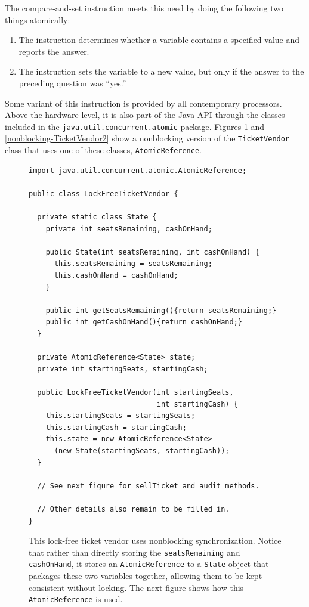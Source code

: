 The compare-and-set instruction meets this need by doing the following two things atomically:
\begin{enumerate}
\item The instruction determines whether a variable contains a specified value and reports the answer.
\item The instruction sets the variable to a new value, but only if the answer to the preceding question was ``yes.''
\end{enumerate}
Some variant of this instruction is provided by all contemporary processors.  Above the hardware
level, it is also part of the Java API through the classes included in the \texttt{java.util.concurrent.atomic} package.
Figures \ref{nonblocking-TicketVendor1} and \ref{nonblocking-TicketVendor2} show a nonblocking version of the \texttt{TicketVendor} class that uses one
of these classes, \texttt{AtomicReference}.
\begin{figure}
\begin{verbatim}
import java.util.concurrent.atomic.AtomicReference;

public class LockFreeTicketVendor { 
    
  private static class State {
    private int seatsRemaining, cashOnHand;
    
    public State(int seatsRemaining, int cashOnHand) {
      this.seatsRemaining = seatsRemaining;
      this.cashOnHand = cashOnHand;
    }

    public int getSeatsRemaining(){return seatsRemaining;}
    public int getCashOnHand(){return cashOnHand;}
  }

  private AtomicReference<State> state;
  private int startingSeats, startingCash;

  public LockFreeTicketVendor(int startingSeats,
                              int startingCash) {
    this.startingSeats = startingSeats;
    this.startingCash = startingCash;
    this.state = new AtomicReference<State>
      (new State(startingSeats, startingCash));
  }

  // See next figure for sellTicket and audit methods.

  // Other details also remain to be filled in.
}
\end{verbatim}
\caption{This lock-free ticket vendor uses nonblocking synchronization.
Notice that rather than directly storing the \texttt{seatsRemaining}
and \texttt{cashOnHand}, it stores an \texttt{AtomicReference} to a
\texttt{State} object that packages these two variables together,
allowing them to be kept consistent without locking.
The next figure shows how this \texttt{AtomicReference} is used.}\label{nonblocking-TicketVendor1}
\end{figure}
